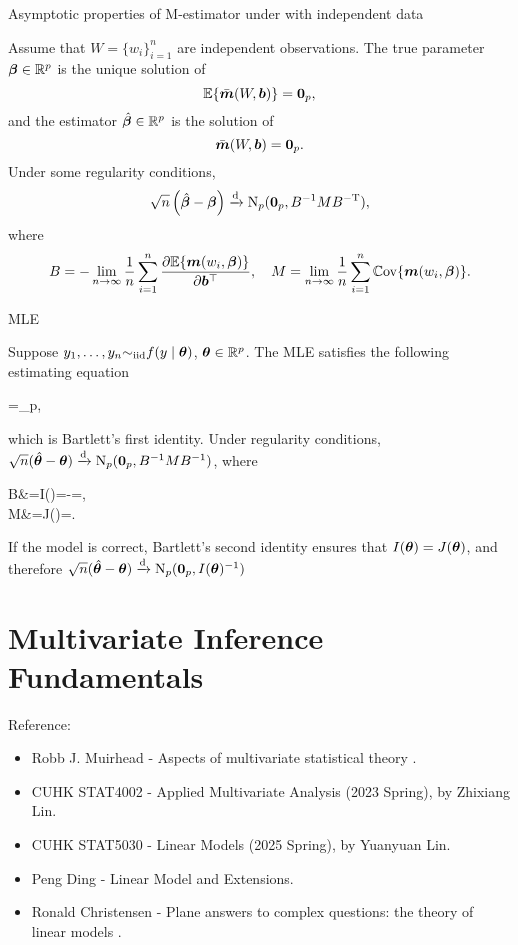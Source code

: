 \documentclass[10pt,a4paper]{book}
\begin{document}
\begin{thmbox}{Asymptotic properties of M-estimator under with independent data}
	\begin{theorem}\label{thm:M_est_asym_indpt}
		Assume that $W=\{w_i\}_{i=1}^{n}$ are independent observations. The true parameter ${\boldsymbol\beta}\in\mathbb{R}^p$ is the unique solution of
		$$\mathbb E\{\bar{{\boldsymbol m}}(W,{\boldsymbol b})\}={\boldsymbol 0}_p,$$
		and the estimator $\hat{{\boldsymbol\beta}}\in\mathbb{R}^p$ is the solution of
		$$
		\bar{{\boldsymbol m}}(W,{\boldsymbol b})={\boldsymbol 0}_p.$$
		Under some regularity conditions,
		$$\sqrt{n}\left(\hat{{\boldsymbol\beta}}-{\boldsymbol\beta}\right)\xrightarrow{\mathrm{d}} \mathrm{N}_p({\boldsymbol 0}_p,B^{-1}MB^{-\mathrm{T}}),$$
		where
		$$
		B=-\lim_{n\to \infty}\frac{1}{n}\sum_{i=1}^{n}\frac{\partial \mathbb E\{{\boldsymbol m}(w_i,{\boldsymbol\beta})\}}{\partial {\boldsymbol b}^\top},\quad M=\lim_{n\to \infty}\frac{1}{n}\sum_{i=1}^{n}\mathbb{C}\mathrm{ov}\{{\boldsymbol m}(w_i,{\boldsymbol\beta})\}.$$
	\end{theorem}
\end{thmbox}

\begin{egbox}{MLE}
	\begin{example}\label{eg:M_est_MLE}
		Suppose $y_1,\ldots,y_n{\sim}_{\mathrm{iid}} f(y\mid{\boldsymbol\theta})$, ${\boldsymbol\theta}\in\mathbb R^p$. 
		The MLE satisfies the following estimating equation 
		\begin{sequation*}
			\bbE{}=\0_p,
		\end{sequation*}
		which is Bartlett's first identity. Under regularity conditions, $\sqrt{n}(\hat{{\boldsymbol\theta}}-{\boldsymbol\theta})\xrightarrow{\mathrm{d}}\mathrm{N}_p({\boldsymbol 0}_p,B^{-1}MB^{-1})$, where
		\begin{salign*}
			B&=I(\baq)=-\frac{\partial}{\partial\baq^\TT}\bbE{}=\bbE{}, \\
			M&=J(\baq)=\bbE{}.
		\end{salign*} 
		If the model is correct, Bartlett’s second identity ensures that $I({\boldsymbol\theta})=J({\boldsymbol\theta})$, and therefore $\sqrt{n}(\hat{{\boldsymbol\theta}}-{\boldsymbol\theta})\xrightarrow{\mathrm{d}}\mathrm{N}_p({\boldsymbol 0}_p,I({\boldsymbol\theta})^{-1})$  
	\end{example}
\end{egbox}

\chapter{Multivariate Inference Fundamentals}\label{chap:multi}
Reference: 
\begin{itemize}
	\item Robb J. Muirhead - Aspects of multivariate statistical theory \cite{muirhead1982aspects}.
	\item CUHK STAT4002 - Applied Multivariate Analysis (2023 Spring), by Zhixiang Lin.
	\item CUHK STAT5030 - Linear Models (2025 Spring), by Yuanyuan Lin.
	\item Peng Ding - Linear Model and Extensions.
	\item Ronald Christensen - Plane answers to
	complex questions: the theory of linear models \cite{christensen2002plane}.
\end{itemize}
\end{document}
